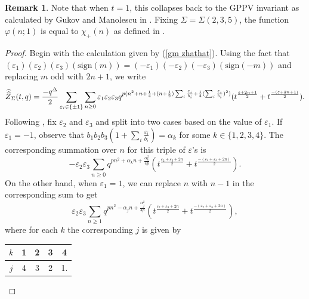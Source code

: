 \documentclass[11pt,letterpaper]{amsart}
\theoremstyle{definition}
\newtheorem*{remark}{Remark}
\theoremstyle{plain}
\newcommand{\Zhathat}{\widehat{\vphantom{\rule{5pt}{10pt}}\smash{\widehat{Z}}\,}\!}
\numberwithin{equation}{section}
\theoremstyle{example}
\begin{document}
\begin{remark}
Note that when $t=1$, this collapses back to the GPPV invariant as calculated by Gukov and Manolescu in \cite{gukovmanolescu}. Fixing $\Sigma=\Sigma(2,3,5)$, the function $\varphi(n;1)$ is equal to $\chi_{+}(n)$ as defined in \cite{lawrencezagier}.
\end{remark}
\begin{proof}
Begin with the calculation given by (\ref{gm zhathat}). Using the fact that \\ $(\varepsilon_{1})(\varepsilon_{2})(\varepsilon_{3})(\text{sign}(m))=(-\varepsilon_{1})(-\varepsilon_{2})(-\varepsilon_{3})(\text{sign}(-m))$ and replacing $m$ odd with $2n+1$, we write \[\Zhathat_\Sigma(t,q)=\frac{-q^{\Delta}}{2}\sum_{\varepsilon_{i}\in \{\pm1\}}\sum_{n \geq 0}\varepsilon_{1}\varepsilon_{2}\varepsilon_{3}q^{p(n^{2}+n+\frac{1}{4}+(n+\frac{1}{2})\sum_{i}\frac{\varepsilon_{i}}{b_{i}}+\frac{1}{4}(\sum_{i}\frac{\varepsilon_{i}}{b_{i}})^{2})}(t^{\frac{\varepsilon+2n+1}{2}}+t^{\frac{-(\varepsilon+2n+1)}{2}}).\] 
Following \cite{gukovmanolescu}, fix $\varepsilon_{2}$ and $\varepsilon_{3}$ and split into two cases based on the value of $\varepsilon_{1}$. If $\varepsilon_{1}=-1$, observe that $b_{1}b_{2}b_{3}(1+\sum_{i}\frac{\varepsilon_{i}}{b_{i}})= \alpha_k$ for some $k \in \{1,2,3,4\}$. The corresponding summation over $n$ for this triple of $\varepsilon$'s is 
\begin{equation} \label{k sum} -\varepsilon_{2}\varepsilon_{3}\sum_{n\geq 0}q^{pn^{2}+\alpha_{k}n+\frac{\alpha_{k}^{2}}{4p}}(t^{\frac{\varepsilon_{2}+\varepsilon_{3}+2n}{2}}+t^{\frac{-(\varepsilon_{2}+\varepsilon_{3}+2n)}{2}}).\end{equation} 
On the other hand, when $\varepsilon_{1}=1$, we can replace $n$ with $n-1$ in the corresponding sum to get \begin{equation}\label{j sum} \varepsilon_{2}\varepsilon_{3}\sum_{n\geq 1}q^{pn^{2}-\alpha_{j}n+\frac{\alpha_{j}^{2}}{4p}}(t^{\frac{\varepsilon_{2}+\varepsilon_{3}+2n}{2}}+t^{\frac{-(\varepsilon_{2}+\varepsilon_{3}+2n)}{2}}),\end{equation} where for each $k$ the corresponding $j$ is given by

\begin{center}\begin{tabular}{c | c c c c}
$k$ & 1 & 2 & 3 & 4 \\ \hline
$j$ & 4 & 3 & 2 & 1.
\end{tabular}
\end{center}


\end{proof}
\end{document}
